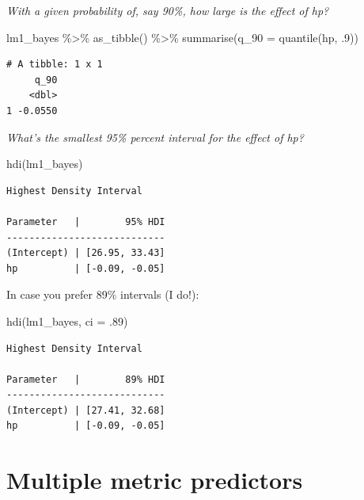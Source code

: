 \documentclass[
  letterpaper,
  DIV=11,
  numbers=noendperiod]{scrreprt}
\newenvironment{Shaded}{\begin{snugshade}}{\end{snugshade}}
\newcommand{\AttributeTok}[1]{\textcolor[rgb]{0.40,0.45,0.13}{#1}}
\newcommand{\DecValTok}[1]{\textcolor[rgb]{0.68,0.00,0.00}{#1}}
\newcommand{\FunctionTok}[1]{\textcolor[rgb]{0.28,0.35,0.67}{#1}}
\newcommand{\NormalTok}[1]{\textcolor[rgb]{0.00,0.23,0.31}{#1}}
\newcommand{\SpecialCharTok}[1]{\textcolor[rgb]{0.37,0.37,0.37}{#1}}
\theoremstyle{definition}
\theoremstyle{definition}
\theoremstyle{remark}
\begin{document}
\emph{With a given probability of, say 90\%, how large is the effect of
hp?}

\begin{Shaded}
\begin{Highlighting}[]
\NormalTok{lm1\_bayes }\SpecialCharTok{\%\textgreater{}\%} 
  \FunctionTok{as\_tibble}\NormalTok{() }\SpecialCharTok{\%\textgreater{}\%} 
  \FunctionTok{summarise}\NormalTok{(}\AttributeTok{q\_90 =} \FunctionTok{quantile}\NormalTok{(hp, .}\DecValTok{9}\NormalTok{))}
\end{Highlighting}
\end{Shaded}

\begin{verbatim}
# A tibble: 1 x 1
     q_90
    <dbl>
1 -0.0550
\end{verbatim}

\emph{What's the smallest 95\% percent interval for the effect of hp?}

\begin{Shaded}
\begin{Highlighting}[]
\FunctionTok{hdi}\NormalTok{(lm1\_bayes)}
\end{Highlighting}
\end{Shaded}

\begin{verbatim}
Highest Density Interval

Parameter   |        95% HDI
----------------------------
(Intercept) | [26.95, 33.43]
hp          | [-0.09, -0.05]
\end{verbatim}

In case you prefer 89\% intervals (I do!):

\begin{Shaded}
\begin{Highlighting}[]
\FunctionTok{hdi}\NormalTok{(lm1\_bayes, }\AttributeTok{ci =}\NormalTok{ .}\DecValTok{89}\NormalTok{)}
\end{Highlighting}
\end{Shaded}

\begin{verbatim}
Highest Density Interval

Parameter   |        89% HDI
----------------------------
(Intercept) | [27.41, 32.68]
hp          | [-0.09, -0.05]
\end{verbatim}

\hypertarget{multiple-metric-predictors}{%
\section{Multiple metric predictors}\label{multiple-metric-predictors}}
\end{document}
